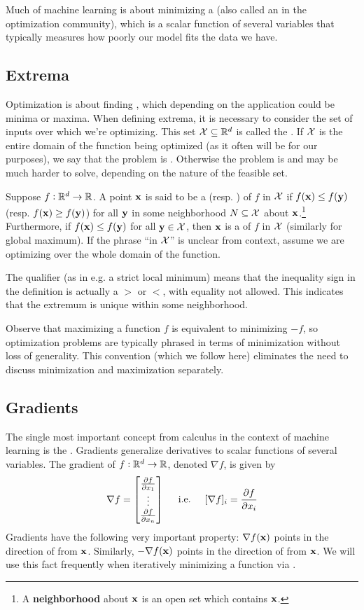 Much of machine learning is about minimizing a  (also called an  in the optimization community), which is a scalar function of several variables that typically measures how poorly our model fits the data we have.

\subsection{Extrema}
Optimization is about finding , which depending on the application could be minima or maxima.
When defining extrema, it is necessary to consider the set of inputs over which we're optimizing.
This set $\mathcal{X} \subseteq \mathbb{R}^d$ is called the .
If $\mathcal{X}$ is the entire domain of the function being optimized (as it often will be for our purposes), we say that the problem is .
Otherwise the problem is  and may be much harder to solve, depending on the nature of the feasible set.

Suppose $f : \mathbb{R}^d \to \mathbb{R}$.
A point $\mathbf{x}$ is said to be a  (resp. ) of $f$ in $\mathcal{X}$ if $f(\mathbf{x}) \leq f(\mathbf{y})$ (resp. $f(\mathbf{x}) \geq f(\mathbf{y})$) for all $\mathbf{y}$ in some neighborhood $N \subseteq \mathcal{X}$ about $\mathbf{x}$.\footnote{
	A \textbf{neighborhood} about $\mathbf{x}$ is an open set which contains $\mathbf{x}$.
}
Furthermore, if $f(\mathbf{x}) \leq f(\mathbf{y})$ for all $\mathbf{y} \in \mathcal{X}$, then $\mathbf{x}$ is a  of $f$ in $\mathcal{X}$ (similarly for global maximum).
If the phrase ``in $\mathcal{X}$'' is unclear from context, assume we are optimizing over the whole domain of the function.

The qualifier  (as in e.g. a strict local minimum) means that the inequality sign in the definition is actually a $>$ or $<$, with equality not allowed.
This indicates that the extremum is unique within some neighborhood.

Observe that maximizing a function $f$ is equivalent to minimizing $-f$, so optimization problems are typically phrased in terms of minimization without loss of generality.
This convention (which we follow here) eliminates the need to discuss minimization and maximization separately.

\subsection{Gradients}
The single most important concept from calculus in the context of machine learning is the .
Gradients generalize derivatives to scalar functions of several variables.
The gradient of $f : \mathbb{R}^d \to \mathbb{R}$, denoted $\nabla f$, is given by
\[\nabla f = \begin{bmatrix}\pdv{f}{x_1} \\ \vdots \\ \pdv{f}{x_n}\end{bmatrix}
\hspace{0.5cm}\text{i.e.}\hspace{0.5cm}
[\nabla f]_i = \pdv{f}{x_i}\]
Gradients have the following very important property: $\nabla f(\mathbf{x})$ points in the direction of  from $\mathbf{x}$.
Similarly, $-\nabla f(\mathbf{x})$ points in the direction of  from $\mathbf{x}$.
We will use this fact frequently when iteratively minimizing a function via .

